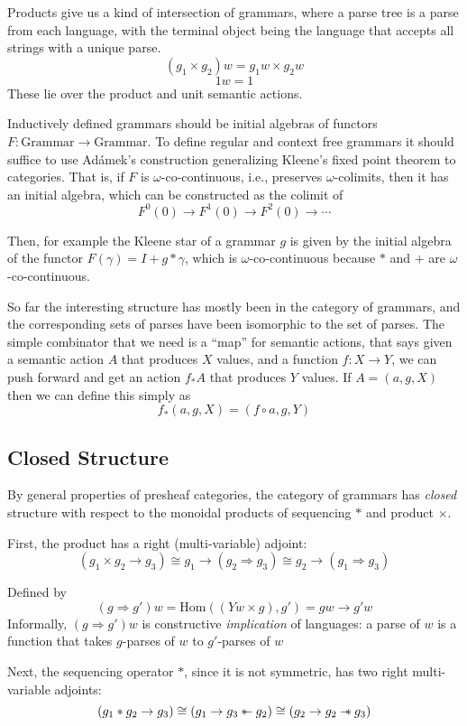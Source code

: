 \documentclass[12pt]{article}
\newcommand{\Grammar}{\textrm{Grammar}}
\newcommand\rsepimp{\mathbin{-\mkern-6mu*}}
\newcommand\lsepimp{\mathbin{\rotatebox[origin=c]{180}{$-\mkern-6mu*$}}}
\newcommand\sepconj{\mathbin{*}}
\begin{document}
Products give us a kind of intersection of grammars, where a parse
tree is a parse from each language, with the terminal object being
the language that accepts all strings with a unique parse.
\[ (g_1 \times g_2) w =  g_1 w \times g_2 w\]
\[ 1 w =  1 \]
These lie over the product and unit semantic actions.

Inductively defined grammars should be initial algebras of functors $F
: \Grammar \to \Grammar$. To define regular and context free grammars
it should suffice to use Ad\'amek's construction generalizing Kleene's
fixed point theorem to categories. That is, if $F$ is
$\omega$-co-continuous, i.e., preserves $\omega$-colimits, then it has
an initial algebra, which can be constructed as the colimit of
\[ F^0(0) \to F^1(0) \to F^2(0) \to \cdots \]

Then, for example the Kleene star of a grammar $g$ is given by the
initial algebra of the functor $F(\gamma) = I + g \sepconj \gamma$,
which is $\omega$-co-continuous because $\sepconj$ and $+$ are
$\omega$-co-continuous.

So far the interesting structure has mostly been in the category of
grammars, and the corresponding sets of parses have been isomorphic to
the set of parses. The simple combinator that we need is a ``map'' for
semantic actions, that says given a semantic action $A$ that produces
$X$ values, and a function $f : X \to Y$, we can push forward and get
an action $f_*A$ that produces $Y$ values. If $A = (a, g, X)$ then we
can define this simply as
\[ f_*(a,g,X) = (f \circ a, g, Y) \]

\subsection{Closed Structure}

By general properties of presheaf categories, the category of
grammars has \emph{closed} structure with respect to the monoidal
products of sequencing $\sepconj$ and product $\times$.

First, the product has a right (multi-variable) adjoint:
\[ (g_1 \times g_2 \to  g_3) \cong g_1 \to (g_2 \Rightarrow g_3) \cong g_2 \to (g_1 \Rightarrow g_3) \]

Defined by
\[ (g \Rightarrow g')w = \textrm{Hom}((Y w \times g), g') = gw \to g'w \]
Informally, $(g \Rightarrow g')w$ is constructive \emph{implication}
of languages: a parse of $w$ is a function that takes $g$-parses of
$w$ to $g'$-parses of $w$

Next, the sequencing operator $\sepconj$, since it is not symmetric, has
two right multi-variable adjoints:
\[ (g_1 \sepconj g_2 \to g_3) \cong (g_1 \to g_3 \lsepimp g_2) \cong (g_2 \to g_2 \rsepimp g_3) \]
\end{document}
